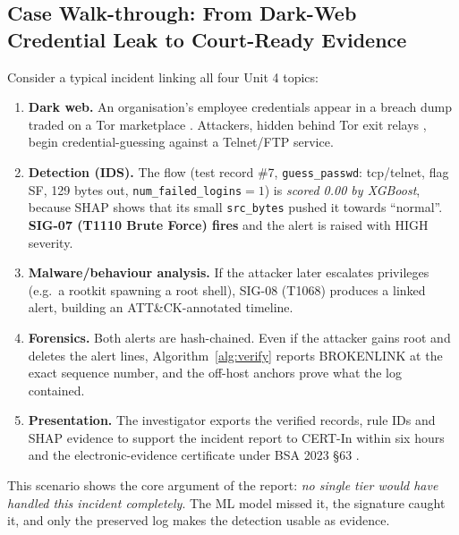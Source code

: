 \documentclass[12pt,a4paper,oneside]{article}
\renewcommand{\textsc}[1]{{\small\MakeUppercase{#1}}}
\begin{document}
\subsection{Case Walk-through: From Dark-Web Credential Leak to Court-Ready Evidence}\label{sec:casewalk}
Consider a typical incident linking all four Unit 4 topics:
\begin{enumerate}
  \item \textbf{Dark web.} An organisation's employee credentials appear in a breach dump traded on a Tor marketplace \cite{christin2013traveling,moore2016cryptopolitik}. Attackers, hidden behind Tor exit relays \cite{dingledine2004tor}, begin credential-guessing against a Telnet/FTP service.
  \item \textbf{Detection (IDS).} The flow (test record \#7, \texttt{guess\_passwd}: tcp/telnet, flag SF, 129 bytes out, \texttt{num\_failed\_logins}$=1$) is \emph{scored 0.00 by XGBoost}, because SHAP shows that its small \texttt{src\_bytes} pushed it towards ``normal''. \textbf{SIG-07 (T1110 Brute Force) fires} and the alert is raised with \textsc{High} severity.
  \item \textbf{Malware/behaviour analysis.} If the attacker later escalates privileges (e.g.\ a rootkit spawning a root shell), SIG-08 (T1068) produces a linked alert, building an ATT\&CK-annotated timeline.
  \item \textbf{Forensics.} Both alerts are hash-chained. Even if the attacker gains root and deletes the alert lines, Algorithm~\ref{alg:verify} reports \textsc{BrokenLink} at the exact sequence number, and the off-host anchors prove what the log contained.
  \item \textbf{Presentation.} The investigator exports the verified records, rule IDs and SHAP evidence to support the incident report to CERT-In within six hours \cite{certin2022} and the electronic-evidence certificate under BSA 2023 \S63 \cite{bsa2023}.
\end{enumerate}
This scenario shows the core argument of the report: \emph{no single tier would have handled this incident completely}. The ML model missed it, the signature caught it, and only the preserved log makes the detection usable as evidence.
\end{document}
